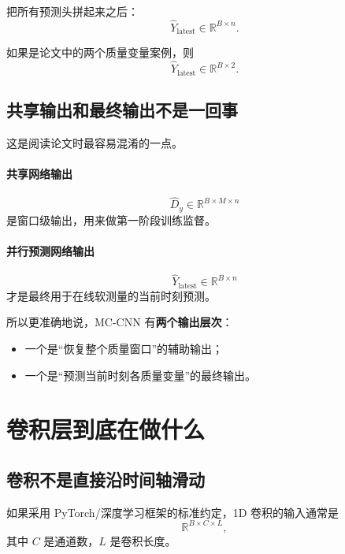 \documentclass[UTF8]{ctexart}
\begin{document}
把所有预测头拼起来之后：
\begin{equation}
    \hat{Y}_{\text{latest}} \in \mathbb{R}^{B \times n}.
\end{equation}

如果是论文中的两个质量变量案例，则
\begin{equation}
    \hat{Y}_{\text{latest}} \in \mathbb{R}^{B \times 2}.
\end{equation}

\subsection{共享输出和最终输出不是一回事}

这是阅读论文时最容易混淆的一点。

\paragraph{共享网络输出}
\begin{equation}
    \hat{D}_y \in \mathbb{R}^{B \times M \times n}
\end{equation}
是窗口级输出，用来做第一阶段训练监督。

\paragraph{并行预测网络输出}
\begin{equation}
    \hat{Y}_{\text{latest}} \in \mathbb{R}^{B \times n}
\end{equation}
才是最终用于在线软测量的当前时刻预测。

所以更准确地说，MC-CNN 有\textbf{两个输出层次}：
\begin{itemize}
    \item 一个是“恢复整个质量窗口”的辅助输出；
    \item 一个是“预测当前时刻各质量变量”的最终输出。
\end{itemize}

\section{卷积层到底在做什么}

\subsection{卷积不是直接沿时间轴滑动}

如果采用 PyTorch/深度学习框架的标准约定，1D 卷积的输入通常是
\begin{equation}
    \mathbb{R}^{B \times C \times L},
\end{equation}
其中 $C$ 是通道数，$L$ 是卷积长度。
\end{document}
